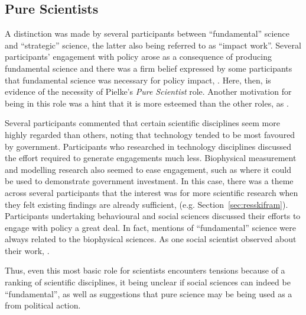 \subsection{Pure Scientists}\label{sec:disscientist}
A distinction was made by several participants between ``fundamental'' science and ``strategic'' science, the latter also being referred to as ``impact work''. Several participants' engagement with policy arose as a consequence of producing fundamental science and there was a firm belief expressed by some participants that fundamental science was necessary for policy impact, . Here, then, is evidence of the necessity of Pielke's \emph{Pure Scientist} role. Another motivation for being in this role was a hint that it is more esteemed than the other roles, as . 

Several participants commented that certain scientific disciplines seem more highly regarded than others, noting that technology tended to be most favoured by government. Participants who researched in technology disciplines discussed the effort required to generate engagements much less. Biophysical measurement and modelling research also seemed to ease engagement, such as where it could be used to demonstrate government investment. In this case, there was a theme across several participants that the interest was for more scientific research when they felt existing findings are already sufficient,  (e.g. Section~\ref{sec:resskifram}). Participants undertaking behavioural and social sciences discussed their efforts to engage with policy a great deal. In fact, mentions of ``fundamental'' science were always related to the biophysical sciences. As one social scientist observed about their work, . 

Thus, even this most basic \SPI{} role for scientists encounters tensions because of a ranking of scientific disciplines, it being unclear if social sciences can indeed be ``fundamental'', as well as suggestions that pure science may be being used as a  from political action.

